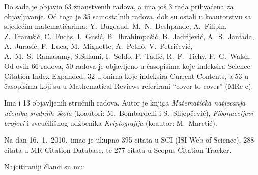 \documentclass[11pt]{report}
\begin{document}
\medskip

Do sada je objavio 63
znanstvenih radova, a ima jo\v{s} 3 rada prihva\'cena za objavljivanje.
Od toga je 35 samostalnih radova,
dok su ostali u koautorstvu sa sljede\'cim matemati\v{c}arima:
Y.~Bugeaud, M.~N.~Deshpande, A.~Filipin, Z.~Franu\v{s}i\'c, C.~Fuchs, I.~Gusi\'c,
B.~Ibrahimpa\v{s}i\'c, B.~Jadrijevi\'c, A.~S.~Janfada, A.~Jurasi\'c, F.~Luca,
M.~Mignotte, A.~Peth\H{o}, V.~Petri\v{c}evi\'c, A.~M.~S.~Ramasamy, S.Salami, I.~Soldo,
P.~Tadi\'c, R.~F.~Tichy, P.~G.~Walsh.
Od ovih 66 radova, 50 radova je objavljeno u \v{c}asopisima koje indeksira
Science Citation Index Expanded, 32 u onima koje indeksira Current Contents,
a 53 u \v{c}asopisima koji su u Mathematical Reviews
referirani ``cover-to-cover'' (MRc-c).

Ima i 13 objavljenih stru\v{c}nih radova. Autor je knjiga {\it
Matemati\v{c}ka natjecanja u\v{c}enika srednjih \v{s}kola}
(koautori: M.~Bombardelli i S.~Slijep\v{c}evi\'c), {\it
Fibonaccijevi brojevi} i sveu\v{c}ili\v{s}nog ud\v{z}benika {\it Kriptografija}
(koautor: M.~Mareti\'c).

\medskip

Na dan 16.~1.~2010.~imao je ukupno
395 citata u SCI (ISI Web of Science),
288 citata u MR Citation Database, te 277 citata u Scopus Citation Tracker.

Najcitiraniji \v{c}lanci su mu:
\end{document}
